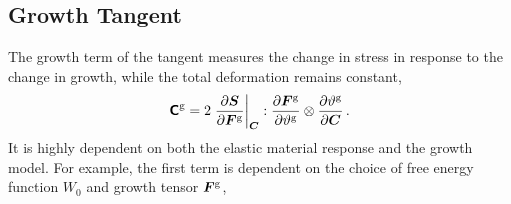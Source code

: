 \documentclass[10pt,letterpaper,oneside]{report}
\newcommand{\ten}[1]{\mbox{\boldmath $#1$}{}}
\newcommand{\tenf}[1]{\mbox{{\sffamily{\bfseries {#1}}}}}
\newcommand{\scas}[1]{\mbox{{\scriptsize{${\rm{#1}}$}}}{}}
\newcommand{\tens}[1]{\mbox{\boldmath{\scriptsize{$#1$}}}{}}
\begin{document}
\subsection{Growth Tangent}
\label{subsec:growth_tangent}
The growth term of the tangent measures the change in stress in response to the change in growth, while the total deformation remains constant, 
\begin{equation}
\tenf{C}^{\scas{g}} = 2 \left. \frac{\partial \ten{S} }{\partial \ten{F}^{\scas{g}} } \right|_{\tens{C}} : \frac{\partial \ten{F}^{\scas{g}} }{\partial \vartheta^{\scas{g}}} \otimes \frac{ \partial \vartheta^{\scas{g}} }{ \partial \ten{C} } \, .  
\end{equation}
It is highly dependent on both the elastic material response and the growth model.  For example, the first term is dependent on the choice of free energy function $W_0$ and growth tensor $\ten{F}^{\scas{g}}$, 
\end{document}
